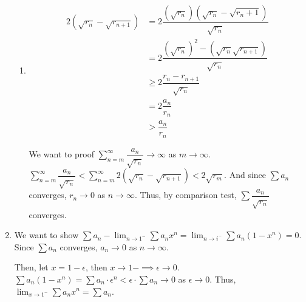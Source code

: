 \documentclass[12pt]{article}
\begin{document}
\begin{enumerate}
\begin{enumerate}
        \item \begin{align*}
            2(\sqrt{r_n} - \sqrt{r_{n+1}}) &= 2\dfrac{(\sqrt{r_n})(\sqrt{r_n} -\sqrt{r_n + 1})}{\sqrt{r_n}}\\
            &= 2 \dfrac{(\sqrt{r_n})^2 - (\sqrt{r_n}\sqrt{r_{n + 1}})}{\sqrt{r_n}}\\
            &\geq 2\dfrac{r_n - r_{n + 1}}{\sqrt{r_n}}\\
            &= 2\dfrac{a_n}{r_n}\\
            &> \dfrac{a_n}{r_n}
        \end{align*}
        
        We want to proof $\displaystyle\sum_{n=m}^{\infty} \dfrac{a_n}{\sqrt{r_n}} \to \infty$ as $m \to \infty$.
        $\displaystyle\sum_{n=m}^{\infty} \dfrac{a_n}{\sqrt{r_n}} < \displaystyle\sum_{n=m}^{\infty} 2(\sqrt{r_n} - \sqrt{r_{n+1}}) < 2\sqrt{r_m}$.
        And since $\sum a_n$ converges, $r_n \to 0$ as $n \to \infty$.
        Thus, by comparison test, $\sum \dfrac{a_n}{\sqrt{r_n}}$ converges.
    \end{enumerate}

    \item We want to show $\sum a_n - \displaystyle\lim_{n\to 1^-} \sum a_nx^n = \displaystyle\lim_{n\to i^-}\sum  a_n (1 - x^n) = 0$.
    Since $\sum a_n$ converges, $a_n\to 0$ as $n\to \infty$.
    
    Then, let $x = 1-\epsilon$, then $x \to 1- \implies \epsilon \to 0$.
    $\sum a_n(1-x^n) = \sum a_n \cdot \epsilon^n < \epsilon\cdot\sum a_n \to 0$ as $\epsilon \to 0$.
    Thus, $\displaystyle\lim_{x\to 1^-} \sum a_n x^n = \sum a_n$.
\end{enumerate}
\end{document}
